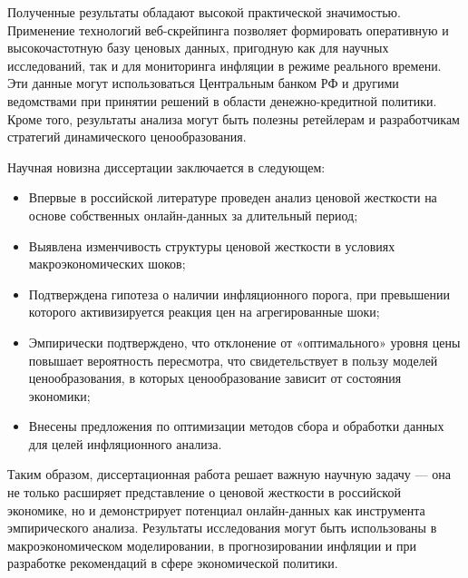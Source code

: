 Полученные результаты обладают высокой практической значимостью. Применение технологий веб-скрейпинга позволяет формировать оперативную и высокочастотную базу ценовых данных, пригодную как для научных исследований, так и для мониторинга инфляции в режиме реального времени. Эти данные могут использоваться Центральным банком РФ и другими ведомствами при принятии решений в области денежно-кредитной политики. Кроме того, результаты анализа могут быть полезны ретейлерам и разработчикам стратегий динамического ценообразования.

Научная новизна диссертации заключается в следующем:
\begin{itemize}
	\item Впервые в российской литературе проведен анализ ценовой жесткости на основе собственных онлайн-данных за длительный период;
	\item Выявлена изменчивость структуры ценовой жесткости в условиях макроэкономических шоков;
	\item Подтверждена гипотеза о наличии инфляционного порога, при превышении которого активизируется реакция цен на агрегированные шоки;
	\item Эмпирически подтверждено, что отклонение от «оптимального» уровня цены повышает вероятность пересмотра, что свидетельствует в пользу моделей ценообразования, в которых ценообразование зависит от состояния экономики;
	\item Внесены предложения по оптимизации методов сбора и обработки данных для целей инфляционного анализа.
\end{itemize}

Таким образом, диссертационная работа решает важную научную задачу — она не только расширяет представление о ценовой жесткости в российской экономике, но и демонстрирует потенциал онлайн-данных как инструмента эмпирического анализа. Результаты исследования могут быть использованы в макроэкономическом моделировании, в прогнозировании инфляции и при разработке рекомендаций в сфере экономической политики.


%
%
